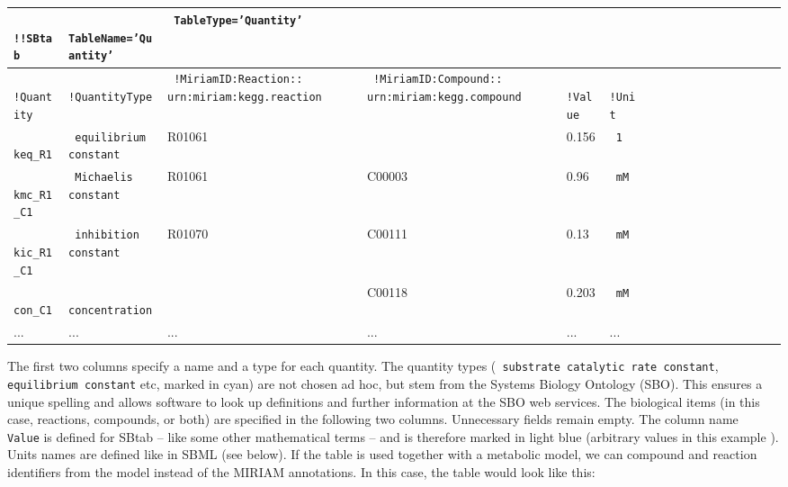 \documentclass[a4paper]{article}
\newcommand{\coout}[1]{}
\newcommand{\tab}[1]{{\texttt{\color{red} #1}}}
\newcommand{\col}[1]{\texttt{\color{blue} #1}}
\newcommand{\defext}[1] {\texttt{\color{lightblue} #1}}
\newcommand{\defint}[1] {\texttt{\color{darkgreen} #1}}
\newcommand{\nick}[1] {\texttt{\color{lila} #1}}
\begin{document}
{\tt \tiny
  \begin{center}
    \begin{tabular}{|l|l|l|l|l|l|l|l|l|l|l|l|l|l|l|ll}
      \hline
      \tab{!!SBtab} & \tab{TableName='Quantity'} & \tab{TableType='Quantity'} & & & \\\hline\hline
      \col{!Quantity} &   \col{!QuantityType} &  \col{!MiriamID:Reaction::}\defext{urn:miriam:kegg.reaction} & \col{!MiriamID:Compound::}\defext{urn:miriam:kegg.compound} &\defint{!Value} &\col{!Unit} \\ \hline
      \nick{keq\_R1}& \defext{equilibrium constant}      &  R01061 &        & 0.156 & \defext{1 }\\ \hline
      \nick{kmc\_R1\_C1}& \defext{Michaelis constant}        &  R01061 & C00003 & 0.96  & \defext{mM}\\ \hline
      \nick{kic\_R1\_C1}& \defext{inhibition constant}       &  R01070 & C00111 & 0.13  & \defext{mM}\\ \hline
      \nick{con\_C1}& \defext{concentration}             &         & C00118 & 0.203 & \defext{mM}\\ \hline
      ... &   ... &   ... &   ... &   ... &  ...  \\ \hline
    \end{tabular}
  \end{center}
}

The first two columns specify a name and a type for each quantity.
The quantity types (\defext{substrate catalytic rate constant},
\defext{equilibrium constant} etc, marked in cyan) are not chosen
ad hoc, but stem from the Systems Biology Ontology (SBO). This ensures
a unique spelling and allows software to look up definitions and
further information at the SBO web services. The biological items (in
this case, reactions, compounds, or both) are specified in the
following two columns. Unnecessary fields remain empty. The column
name \defint{Value} is defined for SBtab -- like some other
mathematical terms -- and is therefore marked in light blue (arbitrary
values in this example \coout{use realistic values!}). Units names
are defined like in SBML (see below).  If the table is used together
with a metabolic model, we can compound and reaction identifiers from
the model instead of the MIRIAM annotations. In this case, the table
would look like this:
\end{document}
